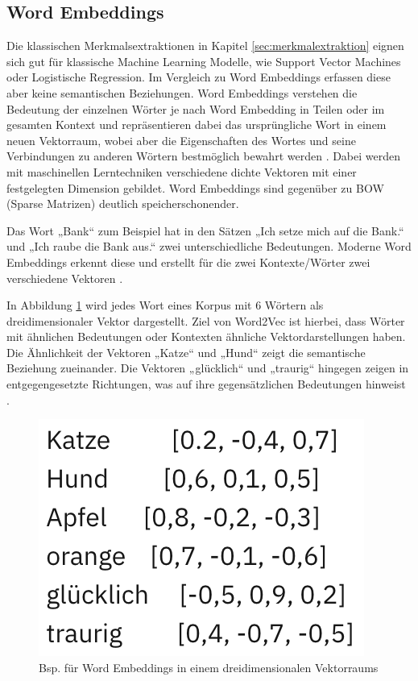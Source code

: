 \subsection{Word Embeddings}
\label{sec:word_embeddings}

Die klassischen Merkmalsextraktionen in Kapitel \ref{sec:merkmalextraktion} eignen sich gut für klassische Machine Learning Modelle, wie
Support Vector Machines oder Logistische Regression.
Im Vergleich zu Word Embeddings erfassen diese aber keine semantischen Beziehungen.
Word Embeddings verstehen die Bedeutung der einzelnen Wörter je nach Word Embedding in Teilen oder im gesamten Kontext \cite{Deshai:2023aa}
und repräsentieren dabei das ursprüngliche Wort in einem neuen Vektorraum, wobei aber die Eigenschaften des Wortes und seine Verbindungen 
zu anderen Wörtern bestmöglich bewahrt werden \cite{Schaer2023}.
Dabei werden mit maschinellen Lerntechniken verschiedene dichte Vektoren mit einer festgelegten Dimension gebildet.
Word Embeddings sind gegenüber zu BOW (Sparse Matrizen) deutlich speicherschonender.

Das Wort „Bank“ zum Beispiel hat in den Sätzen „Ich setze mich auf die Bank.“ und „Ich raube die Bank aus.“ zwei unterschiedliche Bedeutungen. 
Moderne Word Embeddings erkennt diese und erstellt für die zwei Kontexte/Wörter zwei verschiedene Vektoren \cite{skopos2023wordembeddings}.

In Abbildung \ref{fig:bsp_word_embeddings} wird jedes Wort eines Korpus mit 6 Wörtern als dreidimensionaler Vektor dargestellt.
Ziel von Word2Vec ist hierbei, dass Wörter mit ähnlichen Bedeutungen oder Kontexten ähnliche Vektordarstellungen haben. 
Die Ähnlichkeit der Vektoren „Katze“ und „Hund“ zeigt die semantische Beziehung zueinander. Die Vektoren „glücklich“ und „traurig“ 
hingegen zeigen in entgegengesetzte Richtungen, was auf ihre gegensätzlichen Bedeutungen hinweist \cite{ibm2024wordembeddings}.

\begin{figure}[htbp]
    \begin{center}
        \includegraphics[scale=0.6]{static/bsp_word_embeddings.png}
        \caption{\label{fig:bsp_word_embeddings} Bsp. für Word Embeddings in einem dreidimensionalen Vektorraums \cite{ibm2024wordembeddings}}
    \end{center}
\end{figure}

